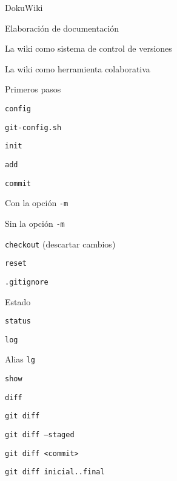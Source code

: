 \begin{longenum}
\begin{longenum}
\begin{longenum}
\begin{longenum}
            \end{longenum}
            \item DokuWiki \opcional\
            \begin{longenum}
                \item Elaboración de documentación
                \item La wiki como sistema de control de versiones
                \item La wiki como herramienta colaborativa
            \end{longenum}
        \end{longenum}
        \item Primeros pasos
        \begin{longenum}
            \item \texttt{config}
            \item \texttt{git-config.sh}
            \item \texttt{init}
            \item \texttt{add}
            \item \texttt{commit}
            \begin{longenum}
                \item Con la opción \texttt{-m}
                \item Sin la opción \texttt{-m}
            \end{longenum}
            \item \texttt{checkout} (descartar cambios)
            \item \texttt{reset}
            \item \texttt{.gitignore}
        \end{longenum}
        \item Estado
        \begin{longenum}
            \item \texttt{status}
            \item \texttt{log}
            \item Alias \texttt{lg}
            \item \texttt{show}
            \item \texttt{diff}
            \begin{longenum}
                \item \texttt{git diff}
                \item \texttt{git diff --staged}
                \item \texttt{git diff <commit>}
                \item \texttt{git diff inicial..final}

\end{longenum}
\end{longenum}
\end{longenum}
\end{longenum}
